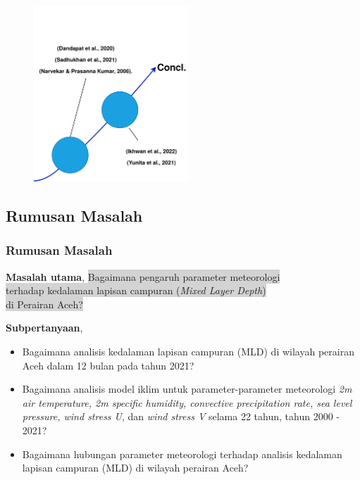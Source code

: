 \documentclass{beamer}
\begin{document}
\begin{frame}[allowframebreaks]
\begin{figure}[H]
	\end{figure}
	\begin{figure}[H]
		\centering
		\includegraphics[width=5.8cm]{intro-3}
	\end{figure}
\end{frame}

\subsection{Rumusan Masalah}
\begin{frame}
	\frametitle{Rumusan Masalah}
	\textbf{Masalah utama},
	\colorbox{lightgray}{Bagaimana pengaruh parameter meteorologi}\\  \colorbox{lightgray}{terhadap kedalaman lapisan campuran (\textit{Mixed Layer Depth})} \\
	\colorbox{lightgray}{di Perairan Aceh?} 
	
	\textbf{Subpertanyaan},
	\begin{itemize}
		\item {\small Bagaimana analisis kedalaman lapisan campuran (MLD) di wilayah perairan Aceh dalam 12 bulan pada tahun 2021?} 
		\item {\small Bagaimana analisis model iklim untuk parameter-parameter meteorologi \textit{2m air temperature, 2m specific humidity, convective precipitation rate, sea level pressure, wind stress U}, dan \textit{wind stress V} selama 22 tahun, tahun 2000 - 2021?}
		\item {\small Bagaimana hubungan parameter meteorologi terhadap analisis kedalaman lapisan campuran (MLD) di wilayah perairan Aceh?}
	\end{itemize}
\end{frame}
\end{document}
